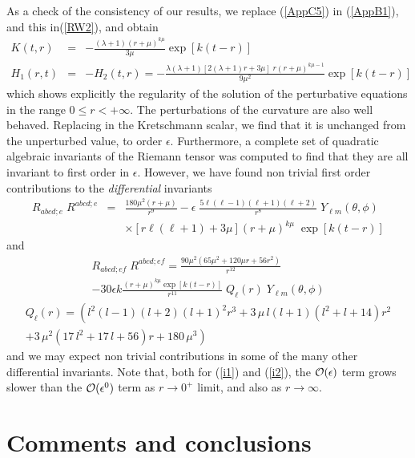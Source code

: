 \documentclass[12pt,aps,floats,showpacs,amssymb,tightenlines]{revtex4}
\newcommand{\e}{\epsilon}
\newcommand{\m}{\mu}
\begin{document}
As a check of the consistency of our results, we replace (\ref{AppC5}) in (\ref{AppB1}),
 and this in(\ref{RW2}), and obtain
\begin{eqnarray}
\label{RW24a}
 K(t,r) & = & -\frac{ (\lambda + 1)(r+\mu)^{k \mu}}{3 \mu}\exp[k(t- r)]   \nonumber \\
 H_1(r,t) & = & -H_2(t,r) = -\frac{\lambda (\lambda+1)
   [2(\lambda+1) r+ 3 \mu] \; r  (r+\mu)^{k\mu -1}}{9 \mu^2}\exp[k(t- r)] \nonumber
\end{eqnarray}
which shows explicitly the regularity of the solution of the perturbative equations in the
 range $0 \leq r < +\infty$. The perturbations of the curvature are also well behaved.
Replacing in the Kretschmann scalar, we find that it is unchanged from the unperturbed value,
to order $\epsilon$.
Furthermore, a complete set of quadratic algebraic invariants of the
Riemann tensor \cite{cm,zm} was computed to find  that they are all
invariant to first order in $\epsilon$. However, we have found non
trivial first order contributions to the  {\em differential}
invariants
\begin{eqnarray} \label{i1}
R_{abcd;e} \; R^{abcd;e} &=& \frac{180 \mu^2 (r + \mu)}{r^9} - \e \;
  \frac{ 5 \ell (\ell-1) (\ell+1)(\ell+2)}{r^8}  \;  Y_{\ell m}(\theta,\phi)\\
\nonumber && \times  \left[ r \ell (\ell+1) + 3 \mu \right]
  (r+\mu)^{k \mu} \;
 \exp[k (t-r)]
\end{eqnarray}
and \begin{multline}
 \label{i2}
R_{abcd;ef} \; R^{abcd;ef} = \frac{90 \m^2 (65 \m^2 +120 \m r+56
r^2)}{r^{12}} \\- 30 \e k \frac{(r+\mu)^{k \mu} \exp[k
(t-r)]}{r^{11}} \; Q_{\ell}(r) \;Y_{\ell m}(\theta,\phi)
\end{multline}
\begin{multline}
Q_{\ell}(r) = \left( {l}^{2} \left( l-1 \right)  \left( l+2 \right)
\left( l+1 \right) ^{2 }{r}^{3}+3\,\mu\,l \left( l+1 \right)  \left(
{l}^{2}+l+14 \right) {r} ^{2} \right. \\ \left.+ 3 \,{\mu}^{2}
\left( 17\,{l}^{2}+17\,l+56 \right) r+180\,{\mu}^{3} \right)
\end{multline}
and we may expect non trivial contributions in some of the many other differential
invariants. Note that, both for  (\ref{i1}) and (\ref{i2}),
the ${\cal O} (\e)$ term  grows slower than the ${\cal O} (\e^0)$ term as
$r \to 0^+$ limit, and also as $r \to \infty$.

\section{Comments and conclusions} \label{cc}
\end{document}
